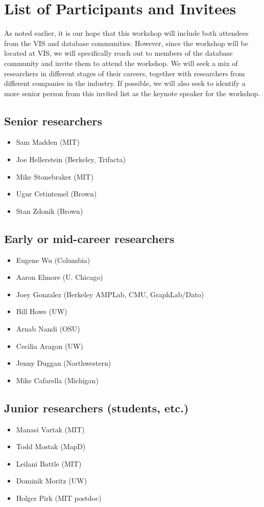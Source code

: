 \documentclass[journal]{vgtc}                %
\begin{document}
\section{List of Participants and Invitees}
\label{sec:invitees}

As noted earlier, it is our hope that this workshop will include both attendees from the VIS and database communities. 
However, since the workshop will be located at VIS, we will specifically reach out to members of the database community and invite them to attend the workshop. 
We will seek a mix of researchers in different stages of their careers, together with researchers from different companies in the industry. 
If possible, we will also seek to identify a more senior person from this invited list as the keynote speaker for the workshop.

\subsection*{Senior researchers}
\begin{itemize}[topsep=0pt, partopsep=0pt, itemsep=-3pt]
\item Sam Madden (MIT)
\item Joe Hellerstein (Berkeley, Trifacta)
\item Mike Stonebraker (MIT)
\item Ugur Cetintemel (Brown)
\item Stan Zdonik (Brown)
\end{itemize}

\subsection*{Early or mid-career researchers}
\begin{itemize}[topsep=0pt, partopsep=0pt, itemsep=-3pt]
\item Eugene Wu (Columbia)
\item Aaron Elmore (U. Chicago)
\item Joey Gonzalez (Berkeley AMPLab, CMU, GraphLab/Dato)
\item Bill Howe (UW)
\item Arnab Nandi (OSU)
\item Cecilia Aragon (UW)
\item Jenny Duggan (Northwestern)
\item Mike Cafarella (Michigan)
\end{itemize}

\subsection*{Junior researchers (students, etc.)}
\begin{itemize}[topsep=0pt, partopsep=0pt, itemsep=-3pt]
\item Manasi Vartak (MIT)
\item Todd Mostak (MapD)
\item Leilani Battle (MIT)
\item Dominik Moritz (UW)
\item Holger Pirk (MIT postdoc)
\end{itemize}
\end{document}
